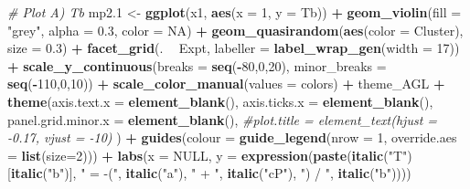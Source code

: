 \documentclass[
]{article}
\newenvironment{Shaded}{\begin{snugshade}}{\end{snugshade}}
\newcommand{\CommentTok}[1]{\textcolor[rgb]{0.56,0.35,0.01}{\textit{#1}}}
\newcommand{\DataTypeTok}[1]{\textcolor[rgb]{0.13,0.29,0.53}{#1}}
\newcommand{\DecValTok}[1]{\textcolor[rgb]{0.00,0.00,0.81}{#1}}
\newcommand{\FloatTok}[1]{\textcolor[rgb]{0.00,0.00,0.81}{#1}}
\newcommand{\KeywordTok}[1]{\textcolor[rgb]{0.13,0.29,0.53}{\textbf{#1}}}
\newcommand{\NormalTok}[1]{#1}
\newcommand{\OperatorTok}[1]{\textcolor[rgb]{0.81,0.36,0.00}{\textbf{#1}}}
\newcommand{\OtherTok}[1]{\textcolor[rgb]{0.56,0.35,0.01}{#1}}
\newcommand{\StringTok}[1]{\textcolor[rgb]{0.31,0.60,0.02}{#1}}
\begin{document}
\begin{Shaded}
\begin{Highlighting}[]
{{{{{{{{{{{{{\CommentTok{# Plot A) Tb}
\NormalTok{mp2}\FloatTok{.1}\NormalTok{ <-}\StringTok{ }\KeywordTok{ggplot}\NormalTok{(x1, }\KeywordTok{aes}\NormalTok{(}\DataTypeTok{x =} \DecValTok{1}\NormalTok{, }\DataTypeTok{y =}\NormalTok{ Tb)) }\OperatorTok{+}\StringTok{ }
\StringTok{  }\KeywordTok{geom_violin}\NormalTok{(}\DataTypeTok{fill =} \StringTok{"grey"}\NormalTok{, }\DataTypeTok{alpha =} \FloatTok{0.3}\NormalTok{, }\DataTypeTok{color =} \OtherTok{NA}\NormalTok{) }\OperatorTok{+}\StringTok{ }
\StringTok{  }\KeywordTok{geom_quasirandom}\NormalTok{(}\KeywordTok{aes}\NormalTok{(}\DataTypeTok{color =}\NormalTok{ Cluster), }\DataTypeTok{size =} \FloatTok{0.3}\NormalTok{) }\OperatorTok{+}\StringTok{ }
\StringTok{  }\KeywordTok{facet_grid}\NormalTok{(. }\OperatorTok{~}\StringTok{ }\NormalTok{Expt, }\DataTypeTok{labeller =} \KeywordTok{label_wrap_gen}\NormalTok{(}\DataTypeTok{width =} \DecValTok{17}\NormalTok{)) }\OperatorTok{+}
\StringTok{  }\KeywordTok{scale_y_continuous}\NormalTok{(}\DataTypeTok{breaks =} \KeywordTok{seq}\NormalTok{(}\OperatorTok{-}\DecValTok{80}\NormalTok{,}\DecValTok{0}\NormalTok{,}\DecValTok{20}\NormalTok{), }\DataTypeTok{minor_breaks =} \KeywordTok{seq}\NormalTok{(}\OperatorTok{-}\DecValTok{110}\NormalTok{,}\DecValTok{0}\NormalTok{,}\DecValTok{10}\NormalTok{)) }\OperatorTok{+}
\StringTok{  }\KeywordTok{scale_color_manual}\NormalTok{(}\DataTypeTok{values =}\NormalTok{ colors) }\OperatorTok{+}
\StringTok{  }\NormalTok{theme_AGL }\OperatorTok{+}
\StringTok{  }\KeywordTok{theme}\NormalTok{(}\DataTypeTok{axis.text.x        =} \KeywordTok{element_blank}\NormalTok{(), }
        \DataTypeTok{axis.ticks.x       =} \KeywordTok{element_blank}\NormalTok{(),}
        \DataTypeTok{panel.grid.minor.x =} \KeywordTok{element_blank}\NormalTok{(),}
        \CommentTok{#plot.title = element_text(hjust = -0.17, vjust = -10)}
\NormalTok{        ) }\OperatorTok{+}
\StringTok{  }\KeywordTok{guides}\NormalTok{(}\DataTypeTok{colour =} \KeywordTok{guide_legend}\NormalTok{(}\DataTypeTok{nrow =} \DecValTok{1}\NormalTok{, }\DataTypeTok{override.aes =} \KeywordTok{list}\NormalTok{(}\DataTypeTok{size=}\DecValTok{2}\NormalTok{))) }\OperatorTok{+}
\StringTok{  }\KeywordTok{labs}\NormalTok{(}\DataTypeTok{x =} \OtherTok{NULL}\NormalTok{,}
       \DataTypeTok{y =} \KeywordTok{expression}\NormalTok{(}\KeywordTok{paste}\NormalTok{(}\KeywordTok{italic}\NormalTok{(}\StringTok{"T"}\NormalTok{)[}\KeywordTok{italic}\NormalTok{(}\StringTok{"b"}\NormalTok{)], }\StringTok{" = -("}\NormalTok{, }\KeywordTok{italic}\NormalTok{(}\StringTok{"a"}\NormalTok{), }\StringTok{" + "}\NormalTok{,}
                            \KeywordTok{italic}\NormalTok{(}\StringTok{"cP"}\NormalTok{), }\StringTok{") / "}\NormalTok{, }\KeywordTok{italic}\NormalTok{(}\StringTok{"b"}\NormalTok{))))}
}}}}}}}}}}}}}
\end{Highlighting}
\end{Shaded}
\end{document}
